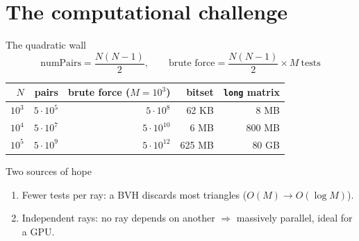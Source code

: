 \documentclass[aspectratio=169,10pt]{beamer}
\begin{document}
\section{The computational challenge}
\begin{frame}{The quadratic wall}
  \[ \text{numPairs}=\frac{N(N-1)}{2}, \qquad \text{brute force}=\frac{N(N-1)}{2}\times M\ \text{tests} \]
  \begin{center}
  \begin{tabular}{rrrrr}
    \hline
    $N$ & pairs & brute force ($M=10^3$) & bitset & \texttt{long} matrix \\ \hline
    $10^3$ & $5\cdot10^5$ & $5\cdot10^8$ & 62 KB & 8 MB \\
    $10^4$ & $5\cdot10^7$ & $5\cdot10^{10}$ & 6 MB & 800 MB \\
    $10^5$ & $5\cdot10^9$ & $5\cdot10^{12}$ & 625 MB & 80 GB \\ \hline
  \end{tabular}
  \end{center}
  \pause
  \begin{block}{Two sources of hope}
    \begin{enumerate}
      \item \alert{Fewer tests per ray}: a BVH discards most triangles ($O(M)\to O(\log M)$).
      \item \alert{Independent rays}: no ray depends on another $\Rightarrow$ massively parallel, ideal for a GPU.
    \end{enumerate}
  \end{block}
\end{frame}

\end{document}
